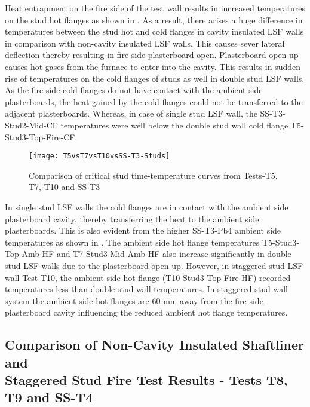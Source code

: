 Heat entrapment on the fire side of the test wall results in increased temperatures on the stud hot flanges as shown in . As a result, there arises a huge difference in temperatures between the stud hot and cold flanges in cavity insulated LSF walls in comparison with non-cavity insulated LSF walls. This causes sever lateral deflection thereby resulting in fire side plasterboard open. Plasterboard open up causes hot gases from the furnace to enter into the cavity. This results in sudden rise of temperatures on the cold flanges of studs as well in double stud LSF walls. As the fire side cold flanges do not have contact with the ambient side plasterboards, the heat gained by the cold flanges could not be transferred to the adjacent plasterboards. Whereas, in case of single stud LSF wall, the SS-T3-Stud2-Mid-CF temperatures were well below the double stud wall cold flange T5-Stud3-Top-Fire-CF. 
\begin{figure}[htbp]
	\centering
		\texttt{[image: T5vsT7vsT10vsSS-T3-Studs]}  
	\caption{Comparison of critical stud time-temperature curves from Tests-T5, T7, T10 and SS-T3}
	\label{fig:T5vsT7vsT10vsSS-T3-Studs}
\end{figure}

In single stud LSF walls the cold flanges are in contact with the ambient side plasterboard cavity, thereby transferring the heat to the ambient side plasterboards. This is also evident from the higher SS-T3-Pb4 ambient side temperatures as shown in . The ambient side hot flange temperatures T5-Stud3-Top-Amb-HF and T7-Stud3-Mid-Amb-HF also increase significantly in double stud LSF walls due to the plasterboard open up. However, in staggered stud LSF wall Test-T10, the ambient side hot flange (T10-Stud3-Top-Fire-HF) recorded temperatures less than double stud wall temperatures. In staggered stud wall system the ambient side hot flanges are 60 mm away from the fire side plasterboard cavity influencing the reduced ambient hot flange temperatures.      

\subsection[Comparison of Non-Cavity Insulated Shaftliner and Staggered Stud Fire Test Results - Tests T8, T9 and SS-T4]{Comparison of Non-Cavity Insulated Shaftliner and\\Staggered Stud Fire Test Results - Tests T8, T9 and SS-T4}

